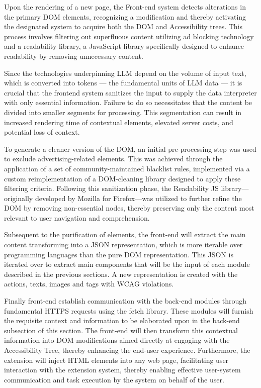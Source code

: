 \documentclass[conference]{IEEEtran}
\begin{document}
Upon the rendering of a new page, the Front-end system detects alterations in the primary DOM elements, recognizing a modification and thereby activating the designated system to acquire both the DOM and Accessibility trees. This process involves filtering out superfluous content utilizing ad blocking technology and a readability library, a JavaScript library specifically designed to enhance readability by removing unnecessary content.

Since the technologies underpinning LLM depend on the volume of input text, which is converted into tokens — the fundamental units of LLM data — it is crucial that the frontend system sanitizes the input to supply the data interpreter with only essential information. Failure to do so necessitates that the content be divided into smaller segments for processing. This segmentation can result in increased rendering time of contextual elements, elevated server costs, and potential loss of context.

To generate a cleaner version of the DOM, an initial pre-processing step was used to exclude advertising-related elements. This was achieved through the application of a set of community-maintained blacklist rules, implemented via a custom reimplementation of a DOM-cleaning library designed to apply these filtering criteria. Following this sanitization phase, the Readability JS library—originally developed by Mozilla for Firefox—was utilized to further refine the DOM by removing non-essential nodes, thereby preserving only the content most relevant to user navigation and comprehension.

Subsequent to the purification of elements, the front-end will extract the main content transforming into a JSON representation, which is more iterable over programming languages than the pure DOM representation. This JSON is iterated over to extract main components that will be the input of each module described in the previous sections. A new representation is created with the actions, texts, images and tags with WCAG violations.

Finally front-end establish communication with the back-end modules through fundamental HTTPS requests using the fetch library. These modules will furnish the requisite context and information to be elaborated upon in the back-end subsection of this section. The front-end will then transform this contextual information into DOM modifications aimed directly at engaging with the Accessibility Tree, thereby enhancing the end-user experience. Furthermore, the extension will inject HTML elements into any web page, facilitating user interaction with the extension system, thereby enabling effective user-system communication and task execution by the system on behalf of the user.
\end{document}
